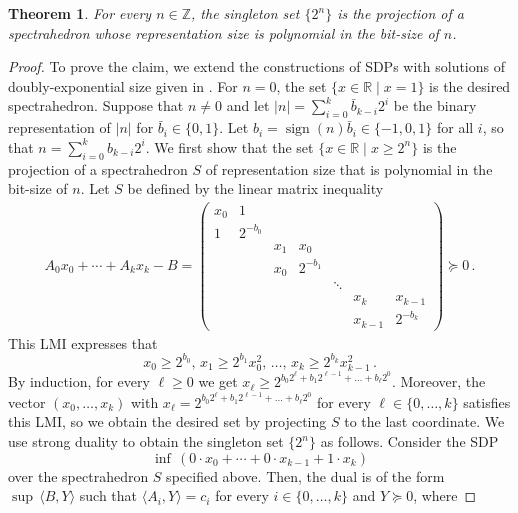\documentclass[11pt]{article}
\newtheorem{theorem}{Theorem}[section]
\theoremstyle{definition}
\theoremstyle{remark}
\newcommand{\R}{\mathbb{R}}
\DeclareMathOperator*{\sign}{\mathrm{sign}}
\begin{document}
\begin{theorem}\label{thm:large-constants}
    For every $n \in {\mathbb Z}$, the singleton set $\{2^{n}\}$ is the projection of a spectrahedron whose representation size is polynomial in the bit-size of $n$. 
\end{theorem}
\begin{proof}
To prove the claim, we extend the constructions of SDPs with solutions of doubly-exponential size given in \cite{KhachiyanPorkolab,Ramana}. For $n = 0$, the set $\{x \in \R \mid x = 1\}$ is the desired spectrahedron. Suppose that $n 
\neq 0$ and let $|n| = \sum_{i = 0}^{k}\bar{b}_{k-i}2^i$ be the binary representation of $|n|$ for $\bar{b}_i 
\in \{0,1\}$. Let $b_i = \sign(n)\bar{b}_i \in \{-1,0,1\}$ for all $i$, so that $n = \sum_{i = 0}^{k}b_{k-i}2^i$. We first show that the set $\{x \in {\mathbb R} \mid x \geq 2^{n} \}$ 
    is the projection of a spectrahedron $S$ of representation size that is polynomial in the bit-size of $n$. Let $S$ be defined by the linear matrix inequality
    \begin{align*}
    A_0 x_0 + \cdots + A_k x_k - B = 
    \begin{pmatrix}
        x_0 & 1 & \\
        1 & 2^{-b_0} \\
        & & x_1 & x_0 \\
        & & x_0 & 2^{-b_1} \\
        & & & & \ddots \\
        & & & & & x_k & x_{k-1} \\
        & & & & & x_{k-1} & 2^{-b_k} 
    \end{pmatrix} \succeq 0 \, .
    \end{align*}
This LMI expresses that
\[
x_0 \ge 2^{b_0}, \, x_1 \ge 2^{b_1}x_0^2, \, \dots, \, x_k \ge 2^{b_k}x_{k-1}^2 \, .
\]
By induction, for every $\ell \ge 0$ we get $x_{\ell} \ge 2^{b_0 2^{\ell} + b_1 2^{\ell-1} + \dots + b_\ell 2^0}$. Moreover, the vector $(x_0,\dots,x_k)$ with $x_{\ell} = 2^{b_0 2^{\ell} + b_1 2^{\ell-1} + \dots + b_\ell 2^0}$ 
for every $\ell \in \{0,\dots,k\}$ 
satisfies this LMI, so we obtain the desired set by projecting $S$ to the last coordinate. We use strong duality to obtain the singleton set $\{2^{n}\}$ as follows. Consider the SDP 
\[
    \inf \, (0 \cdot x_0 + \cdots + 0 \cdot x_{k-1} + 1 \cdot x_k)
    \]
    over the spectrahedron $S$ specified above. Then, the dual is of the form $\sup \, \langle B, Y \rangle$ 
    such that $\langle A_i, Y \rangle = c_i$ for every $i \in \{0,\dots,k\}$ and $Y \succeq 0$, where

\end{proof}
\end{document}
